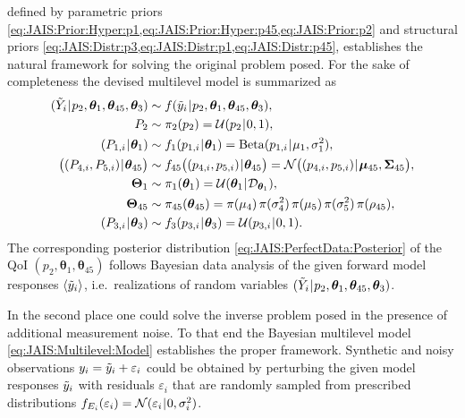defined by parametric priors \cref{eq:JAIS:Prior:Hyper:p1,eq:JAIS:Prior:Hyper:p45,eq:JAIS:Prior:p2} and structural priors \cref{eq:JAIS:Distr:p3,eq:JAIS:Distr:p1,eq:JAIS:Distr:p45},
establishes the natural framework for solving the original problem posed.
For the sake of completeness the devised multilevel model is summarized as
\begin{equation}
  \begin{aligned}
    (\perfect{Y}_i \cond p_2,\bm{\theta}_1,\bm{\theta}_{45},\bm{\theta}_3) &\sim f(\perfect{y}_i \cond p_2,\bm{\theta}_1,\bm{\theta}_{45},\bm{\theta}_3), \\
    P_2 & \sim \pi_2(p_2) = \mathcal{U}(p_2 \cond 0,1), \\
    (P_{1,i} \cond \bm{\theta}_1) &\sim f_1(p_{1,i} \cond \bm{\theta}_1)  = \mathrm{Beta}(p_{1,i} \cond \mu_1,\sigma^2_1), \\
    \big( (P_{4,i},P_{5,i}) \cond \bm{\theta}_{45} \big) &\sim f_{45} \big( (p_{4,i},p_{5,i}) \cond \bm{\theta}_{45} \big) = \mathcal{N} \big( (p_{4,i},p_{5,i}) \cond \bm{\mu}_{45},\bm{\Sigma}_{45} \big), \\
    \bm{\Theta}_1 &\sim \pi_1(\bm{\theta}_1) = \mathcal{U}(\bm{\theta}_1 \cond \mathcal{D}_{\bm{\theta}_1}), \\
    \bm{\Theta}_{45} &\sim \pi_{45}(\bm{\theta}_{45}) =  \pi(\mu_4) \, \pi(\sigma^2_4) \, \pi(\mu_5) \, \pi(\sigma^2_5) \, \pi(\rho_{45}), \\
    (P_{3,i} \cond \bm{\theta}_3) &\sim f_3(p_{3,i} \cond \bm{\theta}_3) = \mathcal{U}(p_{3,i} \cond 0,1).
  \end{aligned}
\end{equation}
The corresponding posterior distribution \cref{eq:JAIS:PerfectData:Posterior} of the QoI \((p_2,\bm{\theta}_1,\bm{\theta}_{45})\)
follows Bayesian data analysis of the given forward model responses \(\langle{\tilde{y}_i}\rangle\),
i.e.\ realizations of random variables \((\tilde{Y}_i {\:\!}|{\:\!} p_2,\bm{\theta}_1,\bm{\theta}_{45},\bm{\theta}_3)\).
\par %
In the second place one could solve the inverse problem posed in the presence of additional measurement noise.
To that end the Bayesian multilevel model \cref{eq:JAIS:Multilevel:Model} establishes the proper framework.
Synthetic and noisy observations \(y_i = \tilde{y}_i + \varepsilon_i\) could be obtained by perturbing the given model responses \(\tilde{y}_i\)
with residuals \(\varepsilon_i\) that are randomly sampled from prescribed distributions \(f_{E_i}(\varepsilon_i) = \mathcal{N}(\varepsilon_i {\:\!}|{\:\!} 0,\sigma^2_i)\).
